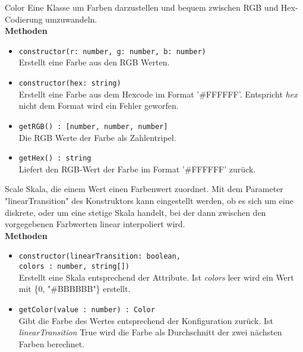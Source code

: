    \begin{Class}{Color}
        Eine Klasse um Farben darzustellen und bequem zwischen RGB und Hex-Codierung umzuwandeln.
        \bigskip\\
        \textbf{Methoden}
        \begin{itemize}
            \item \texttt{constructor(r: number, g: number, b: number)}
            \\ Erstellt eine Farbe aus den RGB Werten.
            \item \texttt{constructor(hex: string)}
            \\ Erstellt eine Farbe aus dem Hexcode im Format '\#FFFFFF'.
            Entspricht \emph{hex} nicht dem Format wird ein Fehler geworfen.
            \item \texttt{getRGB() : [number, number, number]}
            \\ Die RGB Werte der Farbe als Zahlentripel.
            \item \texttt{getHex() : string}
            \\ Liefert den RGB-Wert der Farbe im Format '\#FFFFFF' zurück.
        \end{itemize}
    \end{Class}

    \begin{Class}{Scale}
        Skala, die einem Wert einen Farbenwert zuordnet. Mit dem Parameter "linearTransition" des Konstruktors kann eingestellt werden, ob es sich um eine diskrete, oder um eine stetige Skala handelt, bei der dann zwischen den vorgegebenen Farbwerten linear interpoliert wird.
        \bigskip\\
        \textbf{Methoden}
        \begin{itemize}
            \item \texttt{constructor(linearTransition: boolean,
            \\colors : {number, string}[])}
            \\ Erstellt eine Skala entsprechend der Attribute.
            Ist \emph{colors} leer wird ein Wert mit \{0, "\#BBBBBB"\} erstellt.
            \item \texttt{getColor(value : number) : Color}
            \\ Gibt die Farbe des Wertes entsprechend der Konfiguration zurück.
            Ist \emph{linearTransition} True wird die Farbe als Durchschnitt der zwei nächsten Farben berechnet.
        \end{itemize}
    \end{Class}

